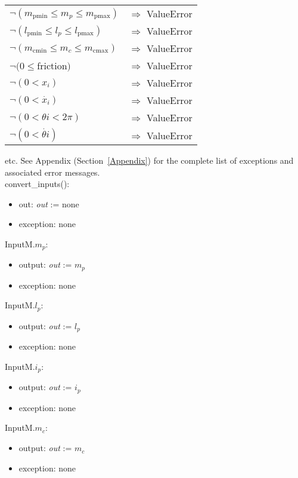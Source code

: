 \documentclass[12pt, titlepage]{article}
\begin{document}
\noindent \begin{longtable*}[l]{l l} 
$\neg (m_{\text{pmin}} \leq m_p \leq m_{\text{pmax}})$ & $\Rightarrow$ ValueError\\

$\neg (l_{\text{pmin}} \leq l_p \leq l_{\text{pmax}})$& $\Rightarrow$  ValueError\\
$\neg (m_{\text{cmin}} \leq m_c\leq m_{\text{cmax}})$ & $\Rightarrow$  ValueError \\
$\neg (0 \leq $friction$)$ & $\Rightarrow$ ValueError\\
$\neg  (0 < x_i)$ & $\Rightarrow$ ValueError\\
$\neg  (0 < \dot{x_i})$ & $\Rightarrow$ ValueError\\
$\neg  (0 < \theta{i}<2\pi)$ & $\Rightarrow$ ValueError\\
$\neg  (0 < \dot{\theta{i}})$ & $\Rightarrow$ ValueError\\
\end{longtable*}
etc.  See Appendix (Section~\ref{Appendix}) for the complete list of exceptions and associated error messages.\\
\newline
\noindent convert\_inputs():
\begin{itemize}
\item out: \textit{out} := none
\item exception: none 
\end{itemize}

\noindent InputM.$m_p$:
\begin{itemize}
\item output: \textit{out} := $m_p$
\item exception: none
\end{itemize}

\noindent InputM.$l_p$:
\begin{itemize}
\item output: \textit{out} := $l_p$
\item exception: none
\end{itemize}
\noindent InputM.$i_p$:
\begin{itemize}
\item output: \textit{out} := $i_p$
\item exception: none
\end{itemize}
\noindent InputM.$m_c$:
\begin{itemize}
\item output: \textit{out} := $m_c$
\item exception: none
\end{itemize}
\end{document}
